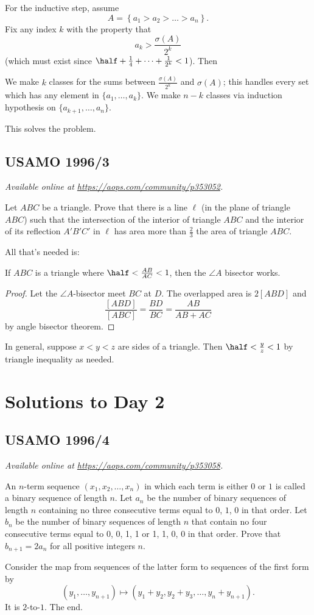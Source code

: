 \documentclass[11pt]{scrartcl}
\begin{document}
For the inductive step, assume
\[ A = \left\{ a_1 > a_2 > \dots > a_n \right\}. \]
Fix any index $k$ with the property that
\[ a_k > \frac{\sigma(A)}{2^k} \]
(which must exist since $\half+\frac14+\dots+\frac{1}{2^k} < 1$).
Then
\begin{itemize}
  \ii We make $k$ classes for the sums between $\frac{\sigma(A)}{2^k}$
  and $\sigma(A)$; this handles every set
  which has any element in $\{a_1, \dots, a_k\}$.
  \ii We make $n-k$ classes via induction hypothesis
  on $\{a_{k+1}, \dots, a_n\}$.
\end{itemize}
This solves the problem.
\pagebreak

\subsection{USAMO 1996/3}
\textsl{Available online at \url{https://aops.com/community/p353052}.}
\begin{mdframed}[style=mdpurplebox,frametitle={Problem statement}]
Let $ABC$ be a triangle. Prove that there is a line $\ell$ (in the plane
of triangle $ABC$) such that the intersection of the interior of
triangle $ABC$ and the interior of its reflection $A'B'C'$ in $\ell$ has
area more than $\frac23$ the area of triangle $ABC$.
\end{mdframed}
All that's needed is:
\begin{claim*}
  If $ABC$ is a triangle where $\half < \frac{AB}{AC} < 1$, then
  the $\angle A$ bisector works.
\end{claim*}
\begin{proof}
  Let the $\angle A$-bisector meet $BC$ at $D$.
  The overlapped area is $2[ABD]$ and
  \[ \frac{[ABD]}{[ABC]} = \frac{BD}{BC} = \frac{AB}{AB+AC} \]
  by angle bisector theorem.
\end{proof}

In general, suppose $x < y < z$ are sides of a triangle.
Then $\half < \frac yz < 1$ by triangle inequality as needed.
\pagebreak

\section{Solutions to Day 2}
\subsection{USAMO 1996/4}
\textsl{Available online at \url{https://aops.com/community/p353058}.}
\begin{mdframed}[style=mdpurplebox,frametitle={Problem statement}]
An $n$-term sequence $(x_1, x_2, \dots, x_n)$
in which each term is either $0$ or $1$ is called a binary sequence of length $n$.
Let $a_n$ be the number of binary sequences of length $n$ containing
no three consecutive terms equal to $0$, $1$, $0$ in that order.
Let $b_n$ be the number of binary sequences of length $n$ that
contain no four consecutive terms equal to 0, 0, 1, 1 or 1, 1, 0, 0 in that order.
Prove that $b_{n+1} = 2a_n$ for all positive integers $n$.
\end{mdframed}
Consider the map from
sequences of the latter form to sequences of the first form by
\[ (y_1, \dots, y_{n+1}) \mapsto (y_1 + y_2, y_2 + y_3, \dots, y_n + y_{n+1}). \]
It is $2$-to-$1$. The end.
\pagebreak
\end{document}

